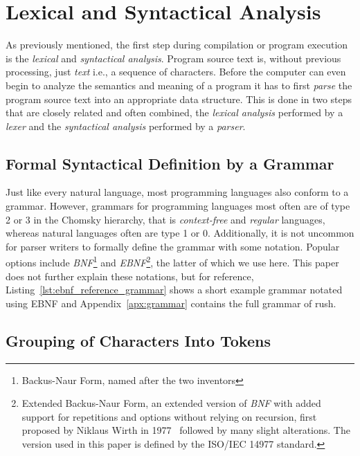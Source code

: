 \section{Lexical and Syntactical Analysis}

\color{purple!90!black}
As previously mentioned, the first step during compilation or program execution is the \emph{lexical} and \emph{syntactical analysis}.
Program source text is, without previous processing, just \emph{text} i.e., a sequence of characters.
Before the computer can even begin to analyze the semantics and meaning of a program it has to first \emph{parse} the program source text into an appropriate data structure.
This is done in two steps that are closely related and often combined, the \emph{lexical analysis} performed by a \emph{lexer} and the \emph{syntactical analysis} performed by a \emph{parser}.

\subsection{Formal Syntactical Definition by a Grammar}

Just like every natural language, most programming languages also conform to a grammar.
However, grammars for programming languages most often are of type 2 or 3 in the Chomsky hierarchy, that is \emph{context-free} and \emph{regular} languages, whereas natural languages often are type 1 or 0.
Additionally, it is not uncommon for parser writers to formally define the grammar with some notation.
Popular options include \emph{BNF}\footnote{Backus-Naur Form, named after the two inventors} and \emph{EBNF}\footnote{Extended Backus-Naur Form, an extended version of \emph{BNF} with added support for repetitions and options without relying on recursion, first proposed by Niklaus Wirth in 1977~\cite{Wirth1977} followed by many slight alterations. The version used in this paper is defined by the ISO/IEC 14977 standard.},  the latter of which we use here.
This paper does not further explain these notations, but for reference, Listing~\ref{lst:ebnf_reference_grammar} shows a short example grammar notated using EBNF and Appendix~\ref{apx:grammar} contains the full grammar of rush.


\subsection{Grouping of Characters Into Tokens}

